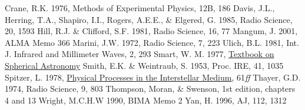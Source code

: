 \documentclass[preprint]{aastex}
\begin{document}
\begin{thebibliography}{}
\bibitem[]{} Crane, R.K. 1976, Methods of Experimental Physics, 12B, 186
\bibitem[]{} Davis, J.L., Herring, T.A., Shapiro, I.I., Rogers, A.E.E., \& Elgered, G. 1985, Radio Science, 20, 1593
\bibitem[]{} Hill, R.J. \& Clifford, S.F.  1981, Radio Science, 16, 77
\bibitem[]{} Mangum, J. 2001, ALMA Memo 366
\bibitem[]{} Marini, J.W. 1972, Radio Science, 7, 223
\bibitem[]{} Ulich, B.L.  1981, Int. J. Infrared and Millimeter Waves, 2, 293
\bibitem[]{} Smart, W. M. 1977, \underline{Textbook on Spherical Astronomy} 
\bibitem[]{} Smith, E.K. \& Weintraub, S. 1953, Proc. IRE, 41, 1035
\bibitem[]{} Spitzer, L. 1978, \underline{Physical Processes in the Interstellar Medium}, 61{\it ff}
\bibitem[]{} Thayer, G.D. 1974, Radio Science, 9, 803
\bibitem[]{} Thompson, Moran, \& Swenson, 1st edition, chapters 4 and 13
\bibitem[]{} Wright, M.C.H.W 1990, BIMA Memo 2
\bibitem[]{} Yan, H. 1996, AJ, 112, 1312
\end{thebibliography}
\end{document}
